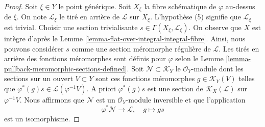 \begin{proof}
Soit  $\xi \in Y$  le point générique. Soit  $X_\xi$  la fibre schématique de
 $\varphi$  au-dessus de  $\xi$. On note  $\mathcal{L}_\xi$  le tiré en arrière de
 $\mathcal{L}$  sur  $X_\xi$. L'hypothèse (5) signifie que  $\mathcal{L}_\xi$  est
trivial. Choisir une section trivialisante  $s \in \Gamma(X_\xi, \mathcal{L}_\xi)$. On observe que
 $X$  est intègre d'après le Lemme  \ref{lemma-flat-over-integral-integral-fibre}. Ainsi, nous pouvons
considérer  $s$  comme une section méromorphe régulière de  $\mathcal{L}$.
Les tirés en arrière des fonctions méromorphes sont définis pour  $\varphi$ 
selon le Lemme  \ref{lemma-pullback-meromorphic-sections-defined}. Soit  $\mathcal{N} \subset \mathcal{K}_Y$  le  $\mathcal{O}_Y$-module dont les
sections sur un ouvert  $V \subset Y$  sont ces fonctions méromorphes  $g \in \mathcal{K}_Y(V)$ 
telles que  $\varphi^*(g)s \in \mathcal{L}(\varphi^{-1}V)$. A priori  $\varphi^*(g)s$  est une section de  $\mathcal{K}_X(\mathcal{L})$  sur
 $\varphi^{-1}V$. Nous affirmons que  $\mathcal{N}$  est un  $\mathcal{O}_Y$-module
inversible et que l'application
$$
\varphi^*\mathcal{N} \longrightarrow \mathcal{L},\quad
g \longmapsto gs
$$
est un isomorphisme.


\end{proof}
